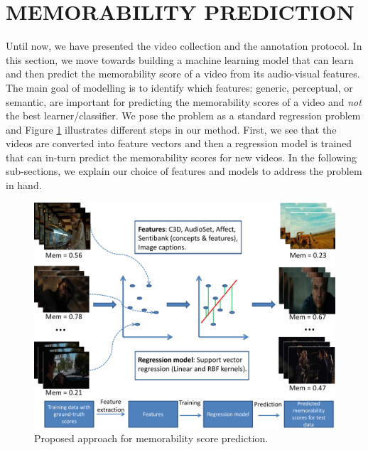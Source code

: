 \documentclass[sigconf]{acmart}
\begin{document}
\section{MEMORABILITY PREDICTION} %
\label{mem-pred}

Until now, we have presented the video collection and the annotation protocol. 
In this section, we move towards building a machine learning model that can learn and then predict the memorability score of a video from its audio-visual features.
The main goal of modelling is to identify which features: generic, perceptual, or semantic, are important for predicting the memorability scores of a video and \emph{not} the best learner/classifier.
We pose the problem as a standard regression problem and Figure \ref{prop-apprch} illustrates different steps in our method.
First, we see that the videos are converted into feature vectors and then a regression model is trained that can in-turn predict the memorability scores for new videos.
In the following sub-sections, we explain our choice of features and models to address the problem in hand.

\begin{figure}[h]	  
  \centering
    \includegraphics[width=0.9\columnwidth]{figures/approach.pdf}
		\caption{Proposed approach for memorability score prediction.}
    \label{prop-apprch}
\end{figure}
\end{document}
